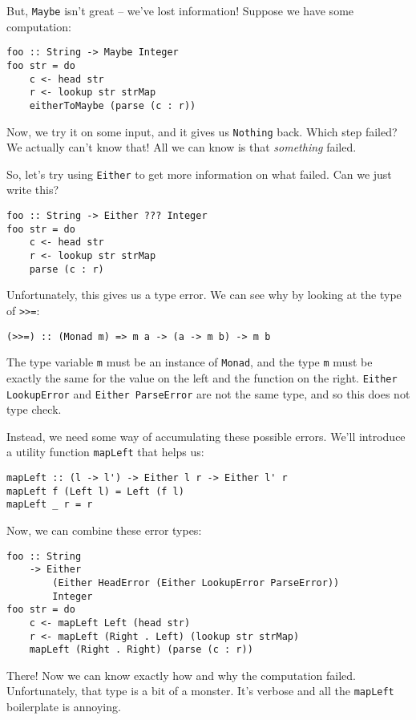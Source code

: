 But, \texttt{Maybe} isn't great -- we've lost information! Suppose we have some computation:

\begin{verbatim}
foo :: String -> Maybe Integer
foo str = do
    c <- head str
    r <- lookup str strMap
    eitherToMaybe (parse (c : r))
\end{verbatim}
Now, we try it on some input, and it gives us \texttt{Nothing} back. Which step failed? We actually can't know that! All we can know is that \textit{something} failed.

So, let's try using \texttt{Either} to get more information on what failed. Can we just write this?

\begin{verbatim}
foo :: String -> Either ??? Integer
foo str = do
    c <- head str
    r <- lookup str strMap
    parse (c : r)
\end{verbatim}
Unfortunately, this gives us a type error. We can see why by looking at the type of \texttt{>>=}:

\begin{verbatim}
(>>=) :: (Monad m) => m a -> (a -> m b) -> m b
\end{verbatim}
The type variable \texttt{m} must be an instance of \texttt{Monad}, and the type \texttt{m} must be exactly the same for the value on the left and the function on the right. \texttt{Either LookupError} and \texttt{Either ParseError} are not the same type, and so this does not type check.

Instead, we need some way of accumulating these possible errors. We'll introduce a utility function \texttt{mapLeft} that helps us:

\begin{verbatim}
mapLeft :: (l -> l') -> Either l r -> Either l' r
mapLeft f (Left l) = Left (f l)
mapLeft _ r = r
\end{verbatim}
Now, we can combine these error types:

\begin{verbatim}
foo :: String
    -> Either
        (Either HeadError (Either LookupError ParseError))
        Integer
foo str = do
    c <- mapLeft Left (head str)
    r <- mapLeft (Right . Left) (lookup str strMap)
    mapLeft (Right . Right) (parse (c : r))
\end{verbatim}
There! Now we can know exactly how and why the computation failed. Unfortunately, that type is a bit of a monster. It's verbose and all the \texttt{mapLeft} boilerplate is annoying.

